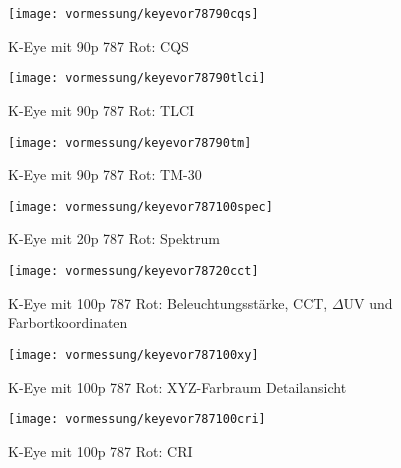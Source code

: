 \documentclass[pagesize,paper=A4,fontsize=12pt,utf8,numbers=noenddot,bibliography=totoc,listof=totoc,DIV=11,BCOR=1mm]{scrreprt}
\begin{document}
\begin{figure}[htp]     %
\centering
\texttt{[image: vormessung/keyevor78790cqs]} 
\caption {K-Eye mit 90p 787 Rot: CQS} 
\end{figure}

\begin{figure}[htp]     %
\centering
\texttt{[image: vormessung/keyevor78790tlci]} 
\caption {K-Eye mit 90p 787 Rot: TLCI} 
\end{figure}

\begin{figure}[htp]     %
\centering
\texttt{[image: vormessung/keyevor78790tm]} 
\caption {K-Eye mit 90p 787 Rot: TM-30} 
\end{figure}




\begin{figure}[htp]     %
\centering
\texttt{[image: vormessung/keyevor787100spec]} 
\caption {K-Eye mit 20p 787 Rot: Spektrum} 
\end{figure}

\begin{figure}[htp]     %
\centering
\texttt{[image: vormessung/keyevor78720cct]} 
\caption {K-Eye mit 100p 787 Rot: Beleuchtungsstärke, CCT, $\Delta$UV und Farbortkoordinaten} 
\end{figure}

\begin{figure}[htp]     %
\centering
\texttt{[image: vormessung/keyevor787100xy]} 
\caption {K-Eye mit 100p 787 Rot: XYZ-Farbraum Detailansicht} 
\end{figure}

\begin{figure}[htp]     %
\centering
\texttt{[image: vormessung/keyevor787100cri]} 
\caption {K-Eye mit 100p 787 Rot: CRI} 
\end{figure}
\end{document}

